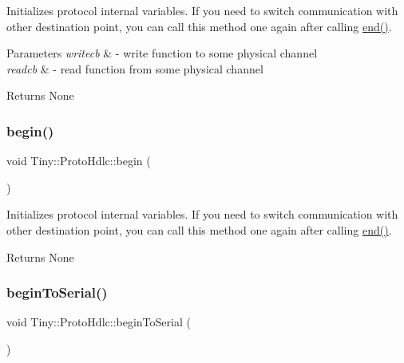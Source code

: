 Initializes protocol internal variables. If you need to switch communication with other destination point, you can call this method one again after calling \hyperlink{classTiny_1_1ProtoHdlc_ad4b84cbcd33d65e7df73321a0c19c420}{end()}. 
\begin{DoxyParams}{Parameters}
{\em writecb} & -\/ write function to some physical channel \\
\hline
{\em readcb} & -\/ read function from some physical channel \\
\hline
\end{DoxyParams}
\begin{DoxyReturn}{Returns}
None 
\end{DoxyReturn}
\mbox{\label{classTiny_1_1ProtoHdlc_aaaca3c70444d6a5f20e7e1fef492e99b}} 
\subsubsection{\texorpdfstring{begin()}{begin()}\hspace{0.1cm}{\footnotesize\ttfamily [2/2]}}
{\footnotesize\ttfamily void Tiny\+::\+Proto\+Hdlc\+::begin (\begin{DoxyParamCaption}{ }\end{DoxyParamCaption})}

Initializes protocol internal variables. If you need to switch communication with other destination point, you can call this method one again after calling \hyperlink{classTiny_1_1ProtoHdlc_ad4b84cbcd33d65e7df73321a0c19c420}{end()}. \begin{DoxyReturn}{Returns}
None 
\end{DoxyReturn}
\mbox{\label{classTiny_1_1ProtoHdlc_a8a54409e420954d93ada44ad0710740e}} 
\subsubsection{\texorpdfstring{begin\+To\+Serial()}{beginToSerial()}}
{\footnotesize\ttfamily void Tiny\+::\+Proto\+Hdlc\+::begin\+To\+Serial (\begin{DoxyParamCaption}{ }\end{DoxyParamCaption})\hspace{0.3cm}{\ttfamily [inline]}}

